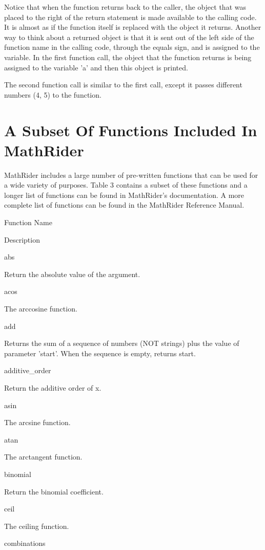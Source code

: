 \documentclass[12pt,oneside]{book}
\begin{document}
Notice that when the function returns back to the caller, the object that was placed to the right of the return statement is made available to the calling code. It is almost as if the function itself is replaced with the object it returns. Another way to think about a returned object is that it is sent out of the left side of the function name in the calling code, through the equals sign, and is assigned to the variable. In the first function call, the object that the function returns is being assigned to the variable 'a' and then this object is printed. 

The second function call is similar to the first call, except it passes different numbers (4, 5) to the function.

\section[A Subset Of Functions Included In MathRider]{A Subset Of Functions Included In MathRider}

MathRider includes a large number of pre{}-written functions that can be used for a wide variety of purposes. Table 3 contains a subset of these functions and a longer list of functions can be found in MathRider's documentation. A more complete list of functions can be found in the MathRider Reference Manual.

Function Name

Description

abs

Return the absolute value of the argument.

acos

The arccosine function.

add

Returns the sum of a sequence of numbers (NOT strings) plus the value of parameter 'start'. When the sequence is empty, returns start.

additive\_order

Return the additive order of x.

asin 

The arcsine function.

atan

The arctangent function.

binomial

Return the binomial coefficient.

ceil

The ceiling function.

combinations
\end{document}
